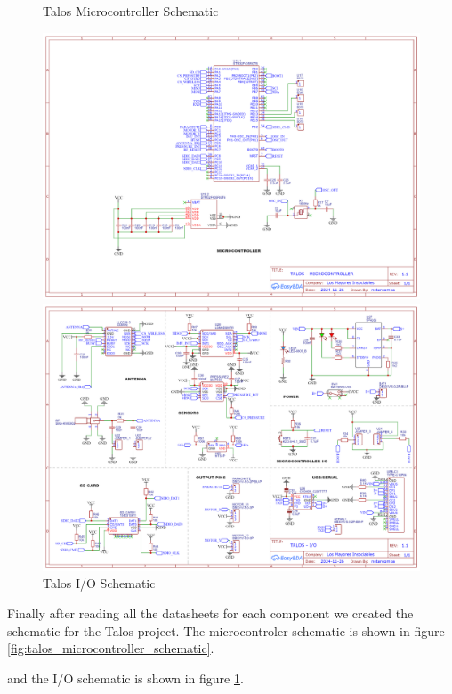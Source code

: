 \documentclass{article}
\begin{document}
\begin{figure}[h]
      \caption{Talos Microcontroller Schematic}
      \label{fig:talos_microcontroller_schematic}
      \centering
      \includegraphics[width=\textwidth]{Microcontroller.png}
      \caption{Talos I/O Schematic}
      \label{fig:talos_io_schematic}
      \centering
      \includegraphics[width=\textwidth]{IO.png}
\end{figure}
Finally after reading all the datasheets for each component we created the schematic for the Talos project. The microcontroler schematic is shown in figure \ref{fig:talos_microcontroller_schematic}.

and the I/O schematic is shown in figure \ref{fig:talos_io_schematic}.
\end{document}
